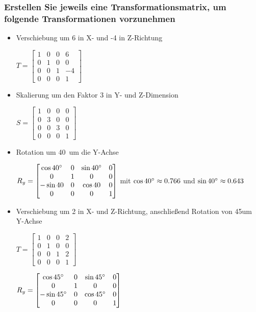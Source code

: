 \subsubsection{Erstellen Sie jeweils eine Transformationsmatrix, um folgende Transformationen vorzunehmen}
\begin{itemize}
	\item  Verschiebung um 6 in X- und -4 in Z-Richtung
	
	$T = \begin{bmatrix}
	1 & 0 & 0 & 6 \\ 
	0 & 1 & 0 & 0 \\ 
	0 & 0 & 1 & -4 \\ 
	0 & 0 & 0 & 1
	\end{bmatrix}  $
	
	\item  Skalierung um den Faktor 3 in Y- und Z-Dimension
	
	$ S = 	\begin{bmatrix}
			1 & 0 & 0 & 0 \\ 0 & 3 & 0 & 0 \\ 0 & 0 & 3 & 0 \\ 0 & 0 & 0 & 1
			\end{bmatrix} $ 
	
	\item  Rotation um 40\degree\ um die Y-Achse
	
	$ R_y = \begin{bmatrix}
				\cos40\degree & 0 & \sin40\degree & 0 \\
				0	& 1 & 0 & 0\\
				-\sin40 & 0 & \cos40 & 0\\
				0 & 0& 0& 1
	\end{bmatrix}$ mit $\cos40\degree \approx 0.766$ und $\sin40\degree \approx 0.643$
	
	\item Verschiebung um 2 in X- und Z-Richtung, anschließend Rotation von 45\degree um Y-Achse
	
	$
		T = \begin{bmatrix}
			1 & 0 & 0 & 2\\
			0 & 1 & 0 & 0\\
			0 & 0 & 1 & 2\\
			0 & 0 & 0 & 1
		\end{bmatrix}$
		
	$	R_y = \begin{bmatrix}
		\cos45\degree & 0 & \sin45\degree & 0\\
		0 & 1 & 0 & 0\\
		-\sin45\degree & 0 & \cos45\degree & 0\\
		0 & 0 & 0 & 1
		\end{bmatrix}
	$
	

\end{itemize}
